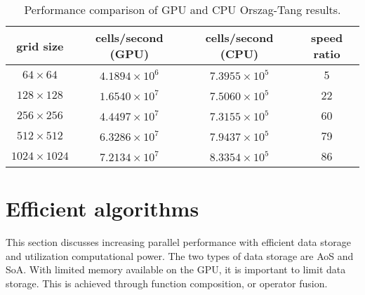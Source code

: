\begin{table}[htbp]%
\caption{Performance comparison of GPU and CPU Orszag-Tang results.}
\begin{tabular*}{\textwidth}{@{\extracolsep{\fill}} cccc}
\\ 
\hline 
\hline 
grid size & cells/second (GPU) & cells/second (CPU) & speed ratio \\
\hline
$64\times64$ & $4.1894\times10^6$ & $7.3955\times10^5$ & 5 \\
$128\times128$ & $1.6540\times10^7$ & $7.5060\times10^5$ & 22 \\
$256\times256$ & $4.4497\times10^7$ & $7.3155\times10^5$ & 60 \\
$512\times512$ & $6.3286\times10^7$ & $7.9437\times10^5$ & 79 \\
$1024\times1024$ & $7.2134\times10^7$ & $8.3354\times10^5$ & 86 \\
\hline
\end{tabular*}
\end{table}


\section[Efficient algorithms]{Efficient algorithms}
\label{sec:efficient_algo}

This section discusses increasing parallel performance with efficient data storage and utilization computational power.  The two types of data storage are AoS and SoA.  With limited memory available on the GPU, it is important to limit data storage.  This is achieved through function composition, or operator fusion.

